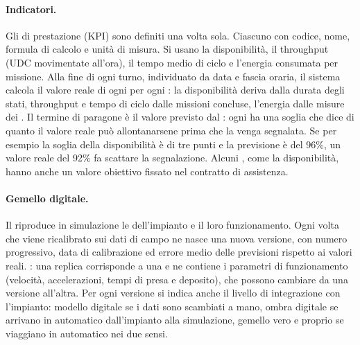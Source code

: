 \paragraph{Indicatori.}
Gli  di prestazione (KPI) sono definiti una volta sola. Ciascuno con
codice, nome, formula di calcolo e unità di misura. Si usano la disponibilità, il throughput (UDC
movimentate all'ora), il tempo medio di ciclo e l'energia consumata per missione. Alla fine di ogni
turno, individuato da data e fascia oraria, il sistema calcola il valore reale di ogni
 per ogni : la disponibilità deriva dalla durata degli stati,
throughput e tempo di ciclo dalle missioni concluse, l'energia dalle misure dei . Il
termine di paragone è il valore previsto dal : ogni  ha
una soglia che dice di quanto il valore reale può allontanarsene prima che la  venga
segnalata. Se per esempio la soglia della disponibilità è di tre punti e la previsione è del 96\%, un
valore reale del 92\% fa scattare la segnalazione. Alcuni , come la disponibilità,
hanno anche un valore obiettivo fissato nel contratto di assistenza.

\paragraph{Gemello digitale.}
Il  riproduce in simulazione le  dell'impianto e il loro
funzionamento. Ogni volta che viene ricalibrato sui dati di campo ne nasce una nuova versione, con numero
progressivo, data di calibrazione ed errore medio delle previsioni rispetto ai valori reali.
: una replica corrisponde a una  e ne contiene i parametri di
funzionamento (velocità, accelerazioni, tempi di presa e deposito), che possono cambiare da una versione
all'altra. Per ogni versione si indica anche il livello di integrazione con
l'impianto: modello digitale se i dati sono scambiati a mano, ombra digitale se
arrivano in automatico dall'impianto alla simulazione, gemello vero e proprio se viaggiano in automatico
nei due sensi.

